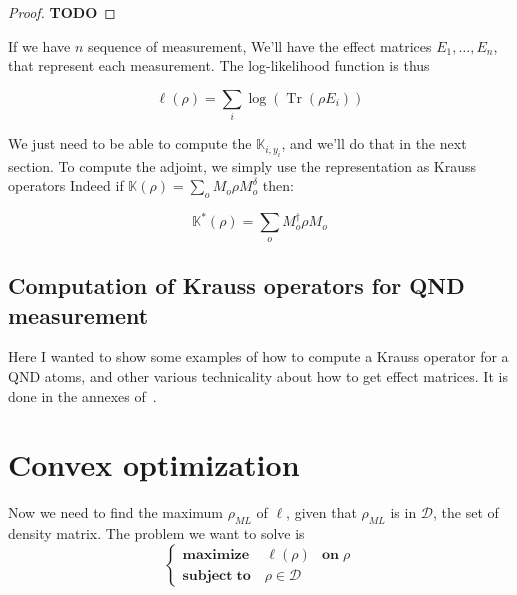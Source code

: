 \documentclass[10pt]{report}
\theoremstyle{plain}
\theoremstyle{definition}
\theoremstyle{remark}
\newcommand{\TODO}{\textbf{TODO}}
\DeclareMathOperator{\Tr}{Tr}
\newcommand{\ml}{_{M\!L}}
\newcommand{\maxim}[3]{\begin{cases}
    \mathbf{maximize}\,\quad #1& \mathbf{on}\; #2\\
    \mathbf{subject\;to}\quad #3
  \end{cases}}
\begin{document}
\begin{proof}
  \TODO{}
\end{proof}


If we have $n$ sequence of measurement, We'll have the effect
matrices $E_1, \ldots, E_n$, that represent each measurement. The log-likelihood
function is thus

\begin{equation}\label{eqn:ll}
  \ell(\rho) = \sum_i \log (\Tr(\rho E_i))
\end{equation}

We just need to be able to compute the $\mathbb K_{i,y_i}$, and we'll do that in
the next section. To compute the adjoint, we simply use the representation as
Krauss operators Indeed if $\mathbb K(\rho) = \sum\limits_o M_o\rho M_o^\delta$
then:

\[\mathbb K^*(\rho) = \sum_o M_o^\dagger \rho M_o\]

\section{Computation of Krauss operators for QND measurement}

Here I wanted to show some examples of how to compute a Krauss operator for a QND
atoms, and other various technicality about how to get effect matrices. It is
done in the annexes of~\cite{VM19}.



\chapter{Convex optimization}

Now we need to find the maximum $\rho\ml$ of $\ell$, given that $\rho\ml$ is in
$\mathcal{D}$, the set of density matrix. The problem we want to solve is
\[\maxim {\ell(\rho)} \rho {\rho \in \mathcal{D}}\]
\end{document}
